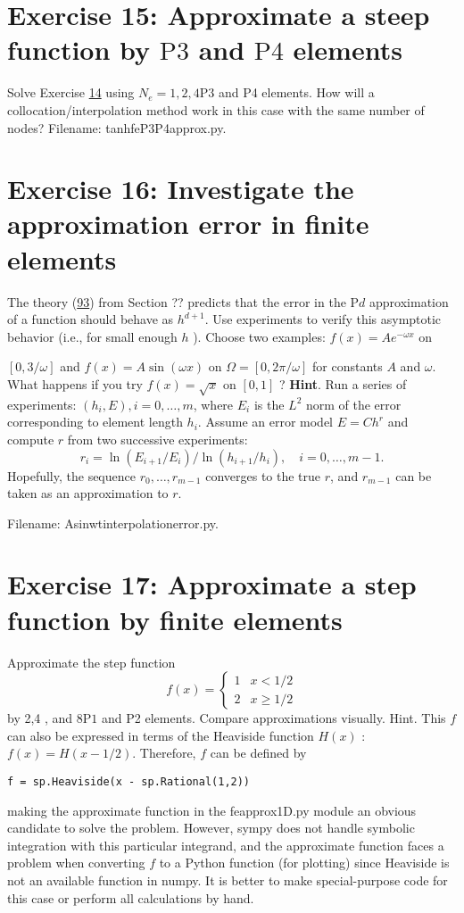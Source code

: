 \documentclass[../main.tex]{subfiles}
\begin{document}
	\section*{Exercise 15: Approximate a steep function by $\mathrm{P} 3$ and $\mathrm{P} 4$ elements}
	\label{sec:sec_10_15}
	\noindent Solve Exercise \hyperref[sec:sec_10_14]{14} using $N_{e}=1,2,4 \mathrm{P} 3$ and P4 elements. How will a collocation/interpolation method work in this case with the same number of nodes? Filename: tanh\textunderscore fe\textunderscore P3P4\textunderscore approx.py.
	\bigbreak
	\section*{Exercise 16: Investigate the approximation error in finite elements}
	\label{sec:sec_10_16}
	\noindent The theory (\hyperref[eqa93]{93}) from Section ?? predicts that the error in the $\mathrm{P} d$ approximation of a function should behave as $h^{d+1}$. Use experiments to verify this asymptotic behavior (i.e., for small enough $h$ ). Choose two examples: $f(x)=A e^{-\omega x}$ on
	
	$[0,3 / \omega]$ and $f(x)=A \sin (\omega x)$ on $\Omega=[0,2 \pi / \omega]$ for constants $A$ and $\omega$. What happens if you try $f(x)=\sqrt{x}$ on $[0,1]$ ?
	\bigbreak
	\noindent \textbf{Hint}. Run a series of experiments: $\left(h_{i}, E\right), i=0, \ldots, m$, where $E_{i}$ is the $L^{2}$ norm of the error corresponding to element length $h_{i}$. Assume an error model $E=C h^{r}$ and compute $r$ from two successive experiments:
	$$
	r_{i}=\ln \left(E_{i+1} / E_{i}\right) / \ln \left(h_{i+1} / h_{i}\right), \quad i=0, \ldots, m-1 .
	$$
	Hopefully, the sequence $r_{0}, \ldots, r_{m-1}$ converges to the true $r$, and $r_{m-1}$ can be taken as an approximation to $r$.
	
	Filename: Asinwt\textunderscore interpolation\textunderscore error.py.
	\bigbreak
	\section*{Exercise 17: Approximate a step function by finite elements}
	\label{sec:sec_10_17}
	\noindent Approximate the step function
	$$
	f(x)= \begin{cases}1 & x<1 / 2 \\ 2 & x \geq 1 / 2\end{cases}
	$$
	by 2,4 , and $8 \mathrm{P} 1$ and P2 elements. Compare approximations visually.
	Hint. This $f$ can also be expressed in terms of the Heaviside function $H(x)$ : $f(x)=H(x-1 / 2)$. Therefore, $f$ can be defined by
	\begin{lstlisting}[numbers=none]
		f = sp.Heaviside(x - sp.Rational(1,2))	
	\end{lstlisting}
	making the approximate function in the fe\textunderscore approx1D.py module an obvious candidate to solve the problem. However, sympy does not handle symbolic integration with this particular integrand, and the approximate function faces a problem when converting $f$ to a Python function (for plotting) since Heaviside is not an available function in numpy. It is better to make special-purpose code for this case or perform all calculations by hand.
	
\end{document}
